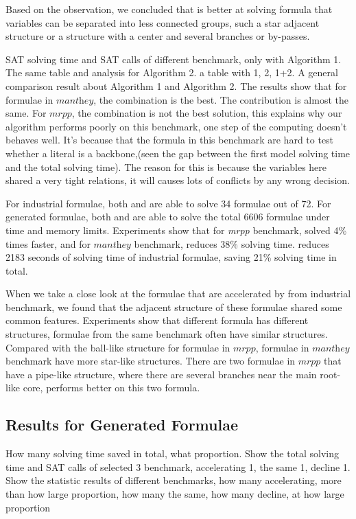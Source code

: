 Based on the observation, we concluded that \tool is better at solving formula that variables can be separated into less connected groups, such a star adjacent structure or a structure with a center and several branches or by-passes.


SAT solving time and SAT calls of different benchmark, only with Algorithm 1.
The same table and analysis for Algorithm 2. a table with 1, 2, 1+2.
A general comparison result about Algorithm 1 and Algorithm 2.
The results show that for formulae in $\textit{manthey}$, the combination is the best. The contribution is almost the same.
For $\textit{mrpp}$, the combination is not the best solution, this explains why our algorithm performs poorly on this benchmark, one step of the computing doesn't behaves well. It's because that the formula in this benchmark are hard to test whether a literal is a backbone,(seen the gap between the first model solving time and the total solving time). The reason for this is because the variables here shared a very tight relations, it will causes lots of conflicts by any wrong decision.

For industrial formulae, both \tool and \minibones are able to solve 34 formulae out of 72. For generated formulae, both \tool and \minibones are able to solve the total 6606 formulae under time and memory limits.
Experiments show that for \textit{mrpp} benchmark, \minibones solved 4\% times faster, and for $\textit{manthey}$ benchmark, \tool reduces 38\% solving time. \tool reduces 2183 seconds of solving time of industrial formulae, saving 21\% solving time in total.

When we take a close look at the formulae that are accelerated by \tool from industrial benchmark, we found that the adjacent structure of these formulae shared some common features. Experiments show that different formula has different structures, formulae from the same benchmark often have similar structures. Compared with the ball-like structure for formulae in $\textit{mrpp}$, formulae in $\textit{manthey}$ benchmark have more star-like structures. There are two formulae in $\textit{mrpp}$ that have a pipe-like structure, where there are several branches near the main root-like core, \tool performs better on this two formula.


\subsection{Results for Generated Formulae}
How many solving time saved in total, what proportion.
Show the total solving time and SAT calls of selected 3 benchmark, accelerating 1, the same 1, decline 1.
Show the statistic results of different benchmarks, how many accelerating, more than how large proportion, how many the same, how many decline, at how large proportion

